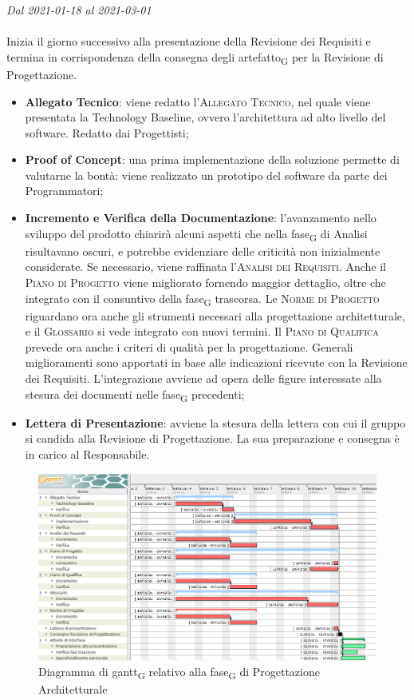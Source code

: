 \textit{Dal 2021-01-18 al 2021-03-01}
\\\\
Inizia il giorno successivo alla presentazione della Revisione dei Requisiti e termina in corrispondenza della consegna degli artefatto\textsubscript{G} per la Revisione di Progettazione.
\begin{itemize}
	\item \textbf{Allegato Tecnico}: viene redatto l'\textsc{Allegato Tecnico}, nel quale viene presentata la Technology Baseline, ovvero l'architettura ad alto livello del software. Redatto dai Progettisti;
	\item \textbf{Proof of Concept}: una prima implementazione della soluzione permette di valutarne la bontà: viene realizzato un prototipo del software da parte dei Programmatori;
	\item \textbf{Incremento e Verifica della Documentazione}: l'avanzamento nello sviluppo del prodotto chiarirà alcuni aspetti che nella fase\textsubscript{G} di Analisi risultavano oscuri, e potrebbe evidenziare delle criticità non inizialmente considerate. Se necessario, viene raffinata l'\textsc{Analisi dei Requisiti}. Anche il \textsc{Piano di Progetto} viene migliorato fornendo maggior dettaglio, oltre che integrato con il consuntivo della fase\textsubscript{G} trascorsa. Le \textsc{Norme di Progetto} riguardano ora anche gli strumenti necessari alla progettazione architetturale, e il \textsc{Glossario} si vede integrato con nuovi termini. Il \textsc{Piano di Qualifica} prevede ora anche i criteri di qualità per la progettazione. Generali miglioramenti sono apportati in base alle indicazioni ricevute con la Revisione dei Requisiti. L'integrazione avviene ad opera delle figure interessate alla stesura dei documenti nelle fase\textsubscript{G} precedenti;
	\item \textbf{Lettera di Presentazione}: avviene la stesura della lettera con cui il gruppo si candida alla Revisione di Progettazione. La sua preparazione e consegna è in carico al Responsabile.
\end{itemize}

\begin{figure}[H]
	\centering
	\includegraphics[scale=0.50]{res/images/03_gantt_progettazione.png}
	\caption{Diagramma di gantt\textsubscript{G} relativo alla fase\textsubscript{G} di Progettazione Architetturale}
\end{figure}

